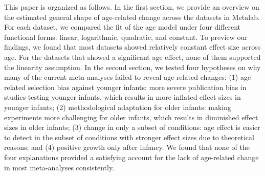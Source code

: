 \documentclass[
  man]{apa6}
\begin{document}
This paper is organized as follows. In the first section, we provide an overview on the estimated general shape of age-related change across the datasets in Metalab. For each dataset, we compared the fit of the age model under four different functional forms: linear, logarithmic, quadratic, and constant. To preview our findings, we found that most datasets showed relatively constant effect size across age. For the datasets that showed a significant age effect, none of them supported the linearity assumption. In the second section, we tested four hypotheses on why many of the current meta-analyses failed to reveal age-related changes: (1) age-related selection bias against younger infants: more severe publication bias in studies testing younger infants, which results in more inflated effect sizes in younger infants; (2) methodological adaptation for older infants: making experiments more challenging for older infants, which results in diminished effect sizes in older infants; (3) change in only a subset of conditions: age effect is easier to detect in the subset of conditions with stronger effect sizes due to theoretical reasons; and (4) positive growth only after infancy. We found that none of the four explanations provided a satisfying account for the lack of age-related change in most meta-analyses consistently.
\end{document}
